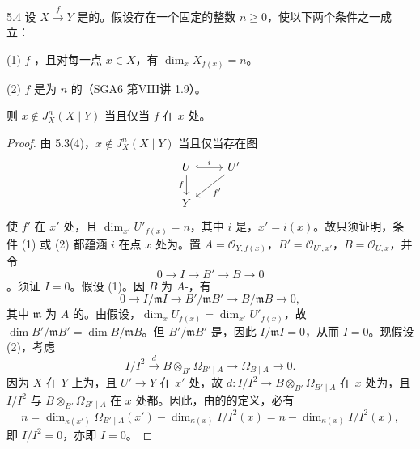 \begin{SGAresult}{}{5.4}
设 $X\xrightarrow f Y$ 是的。假设存在一个固定的整数 $n\geq0$，使以下两个条件之一成立：

(1) $f$ ，且对每一点 $x\in X$，有 $\dim_x X_{f(x)}=n$。

(2) $f$ 是为 $n$ 的（SGA6 第VIII讲 1.9）。

则 $x\notin J_X^n(X\mid Y)$ 当且仅当 $f$ 在 $x$ 处。
\end{SGAresult}
\begin{proof}
由 5.3(4)，$x\notin J_X^n(X\mid Y)$ 当且仅当存在图
\[
\begin{tikzcd}
U\arrow[r,hook,"i"]\arrow[d,"f"']&U'\arrow[dl,"f'"]\\
Y&
\end{tikzcd}
\]
使 $f'$ 在 $x'$ 处，且 $\dim_{x'}U'_{f(x)}=n$，其中 $i$ 是，$x'=i(x)$。故只须证明，条件 (1) 或 (2) 都蕴涵 $i$ 在点 $x$ 处为。置 $A=\mathcal O_{Y,f(x)}$，$B'=\mathcal O_{U',x'}$，$B=\mathcal O_{U,x}$，并令
\[
0\longrightarrow I\longrightarrow B'\longrightarrow B\longrightarrow0
\]
。须证 $I=0$。假设 (1)。因 $B$ 为 $A$-，有
\[
0\longrightarrow I/\mathfrak mI\longrightarrow B'/\mathfrak mB'
\longrightarrow B/\mathfrak mB\longrightarrow0,
\]
其中 $\mathfrak m$ 为 $A$ 的。由假设，$\dim_x U_{f(x)}=\dim_{x'}U'_{f(x)}$，故 $\dim B'/\mathfrak mB'=\dim B/\mathfrak mB$。但 $B'/\mathfrak mB'$ 是，因此 $I/\mathfrak mI=0$，从而 $I=0$。现假设 (2)，考虑
\[
I/I^2\xrightarrow d B\otimes_{B'}\Omega_{B'\mid A}\longrightarrow\Omega_{B\mid A}\longrightarrow0.
\]
因为 $X$ 在 $Y$ 上为，且 $U'\to Y$ 在 $x'$ 处，故 $d:I/I^2\to B\otimes_{B'}\Omega_{B'\mid A}$ 在 $x$ 处为，且 $I/I^2$ 与 $B\otimes_{B'}\Omega_{B'\mid A}$ 在 $x$ 处都。因此，由的的定义，必有
\[
n=\dim_{\kappa(x')}\Omega_{B'\mid A}(x')-\dim_{\kappa(x)}I/I^2(x)
 =n-\dim_{\kappa(x)}I/I^2(x),
\]
即 $I/I^2=0$，亦即 $I=0$。
\end{proof}

